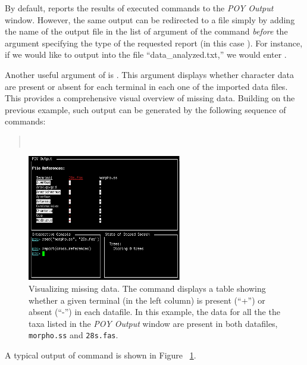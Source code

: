 By default, \poy reports the results of executed commands to the \emph{POY Output} window. However, the same output can be redirected to a file simply by adding the name of the output file in the list of argument of the command  \emph{before} the argument specifying the type of the requested report (in this case ). For instance, if we would like to output into the file ``data\_analyzed.txt,'' we would enter .

Another useful argument of  is . This argument displays whether character data are present or absent for each terminal in each one of the imported data files. This provides a comprehensive visual overview of missing data. Building on the previous example, such output can be generated by the following sequence of commands:
\begin{quote}
    \\
\end{quote}

\begin{figure}[]
    \begin{center}
        \includegraphics[width=0.6\textwidth]{figures/crossref.jpg}
    \end{center}
    \caption{Visualizing missing data. The command  displays a table showing whether a given terminal (in the left column) is present (``+'') or absent (``-'') in each datafile. In this example, the data for all the the taxa listed in the \emph{POY Output} window are present in both datafiles, \texttt{morpho.ss} and \texttt{28s.fas}.}
    \label{fig:crossref}
\end{figure}

A typical output of  command is shown in Figure ~\ref{fig:crossref}.

